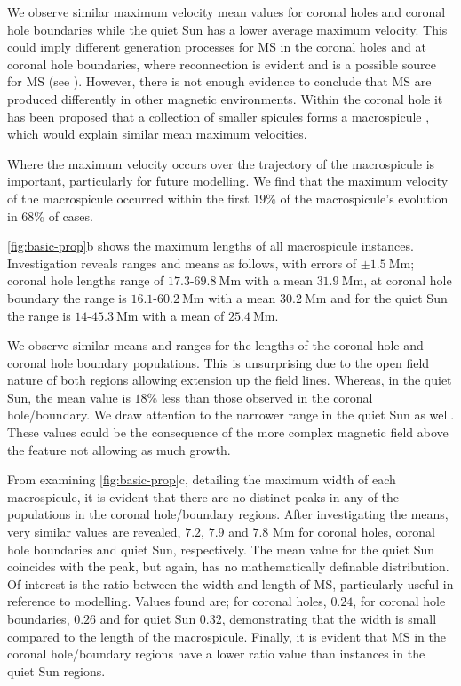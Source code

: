 We observe similar maximum velocity mean values for coronal holes and coronal hole boundaries while the quiet Sun has a lower average maximum velocity. This could imply different generation processes for MS in the coronal holes and at coronal hole boundaries, where reconnection is evident \cite{Patsourakos1999} and is a possible source for MS (see \cite{Heggland2009}). However, there is not enough evidence to conclude that MS are produced differently in other magnetic environments. Within the coronal hole it has been proposed that a collection of smaller spicules forms a macrospicule \cite{Scullion2009}, which would explain similar mean maximum velocities.

Where the maximum velocity occurs over the trajectory of the macrospicule is important, particularly for future modelling. We find that the maximum velocity of the macrospicule occurred within the first $19\%$ of the macrospicule's evolution in $68\%$ of cases.

\cref{fig:basic-prop}b shows the maximum lengths of all macrospicule instances. Investigation reveals ranges and means as follows, with errors of $\pm1.5\ \textrm{Mm}$; coronal hole lengths range of $17.3$-$69.8\ \textrm{Mm}$ with a mean $31.9\ \textrm{Mm}$, at coronal hole boundary the range is $16.1$-$60.2\ \textrm{Mm}$ with a mean $30.2\ \textrm{Mm}$ and for the quiet Sun the range is $14$-$45.3\ \textrm{Mm}$ with a mean of $25.4\ \textrm{Mm}$. 

We observe similar means and ranges for the lengths of the coronal hole and coronal hole boundary populations. This is unsurprising due to the open field nature of both regions allowing extension up the field lines. Whereas, in the quiet Sun, the mean value is $18\%$ less than those observed in the coronal hole/boundary. We draw attention to the narrower range in the quiet Sun as well. These values could be the consequence of the more complex magnetic field above the feature not allowing as much growth. 

From examining \cref{fig:basic-prop}c, detailing the maximum width of each macrospicule, it is evident that there are no distinct peaks in any of the populations in the coronal hole/boundary regions. After investigating the means, very similar values are revealed, $7.2$, $7.9$ and $7.8$ Mm for coronal holes, coronal hole boundaries and quiet Sun, respectively. The mean value for the quiet Sun coincides with the peak, but again, has no mathematically definable distribution. Of interest is the ratio between the width and length of MS, particularly useful in reference to modelling. Values found are; for coronal holes, $0.24$, for coronal hole boundaries, $0.26$ and for quiet Sun $0.32$, demonstrating that the width is small compared to the length of the macrospicule. Finally, it is evident that MS in the coronal hole/boundary regions have a lower ratio value than instances in the quiet Sun regions.


